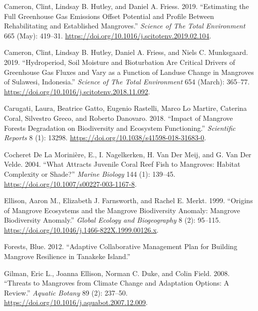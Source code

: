 \documentclass[
]{article}
\newlength{\cslhangindent}
\newenvironment{CSLReferences}[2] %
 {\begin{list}{}{%
  \setlength{\itemindent}{0pt}
  \setlength{\leftmargin}{0pt}
  \setlength{\parsep}{0pt}
  \ifodd #1
   \setlength{\leftmargin}{\cslhangindent}
   \setlength{\itemindent}{-1\cslhangindent}
  \fi
  \setlength{\itemsep}{#2\baselineskip}}}
 {\end{list}}
\begin{document}
\begin{CSLReferences}{1}{0}
Cameron, Clint, Lindsay B. Hutley, and Daniel A. Friess. 2019. {``Estimating the Full Greenhouse Gas Emissions Offset Potential and Profile Between Rehabilitating and Established Mangroves.''} \emph{Science of The Total Environment} 665 (May): 419--31. \url{https://doi.org/10.1016/j.scitotenv.2019.02.104}.

Cameron, Clint, Lindsay B. Hutley, Daniel A. Friess, and Niels C. Munksgaard. 2019. {``Hydroperiod, Soil Moisture and Bioturbation Are Critical Drivers of Greenhouse Gas Fluxes and Vary as a Function of Landuse Change in Mangroves of {Sulawesi}, {Indonesia}.''} \emph{Science of The Total Environment} 654 (March): 365--77. \url{https://doi.org/10.1016/j.scitotenv.2018.11.092}.

Carugati, Laura, Beatrice Gatto, Eugenio Rastelli, Marco Lo Martire, Caterina Coral, Silvestro Greco, and Roberto Danovaro. 2018. {``Impact of Mangrove Forests Degradation on Biodiversity and Ecosystem Functioning.''} \emph{Scientific Reports} 8 (1): 13298. \url{https://doi.org/10.1038/s41598-018-31683-0}.

Cocheret De La Morinière, E., I. Nagelkerken, H. Van Der Meij, and G. Van Der Velde. 2004. {``What Attracts Juvenile Coral Reef Fish to Mangroves: Habitat Complexity or Shade?''} \emph{Marine Biology} 144 (1): 139--45. \url{https://doi.org/10.1007/s00227-003-1167-8}.

Ellison, Aaron M., Elizabeth J. Farnsworth, and Rachel E. Merkt. 1999. {``Origins of Mangrove Ecosystems and the Mangrove Biodiversity Anomaly: {Mangrove} Biodiversity Anomaly.''} \emph{Global Ecology and Biogeography} 8 (2): 95--115. \url{https://doi.org/10.1046/j.1466-822X.1999.00126.x}.

Forests, Blue. 2012. {``Adaptive {Collaborative Management Plan} for {Building Mangrove Resilience} in {Tanakeke Island}.''}

Gilman, Eric L., Joanna Ellison, Norman C. Duke, and Colin Field. 2008. {``Threats to Mangroves from Climate Change and Adaptation Options: {A} Review.''} \emph{Aquatic Botany} 89 (2): 237--50. \url{https://doi.org/10.1016/j.aquabot.2007.12.009}.


\end{CSLReferences}
\end{document}
